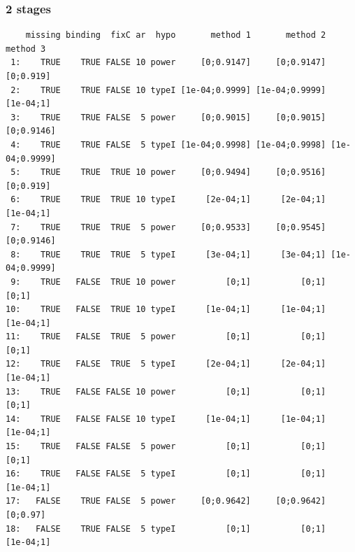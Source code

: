 \documentclass[12pt]{article}
\begin{document}
\subsubsection{2 stages}
\label{sec:orgd6a613a}
\begin{verbatim}
    missing binding  fixC ar  hypo       method 1       method 2       method 3
 1:    TRUE    TRUE FALSE 10 power     [0;0.9147]     [0;0.9147]      [0;0.919]
 2:    TRUE    TRUE FALSE 10 typeI [1e-04;0.9999] [1e-04;0.9999]      [1e-04;1]
 3:    TRUE    TRUE FALSE  5 power     [0;0.9015]     [0;0.9015]     [0;0.9146]
 4:    TRUE    TRUE FALSE  5 typeI [1e-04;0.9998] [1e-04;0.9998] [1e-04;0.9999]
 5:    TRUE    TRUE  TRUE 10 power     [0;0.9494]     [0;0.9516]      [0;0.919]
 6:    TRUE    TRUE  TRUE 10 typeI      [2e-04;1]      [2e-04;1]      [1e-04;1]
 7:    TRUE    TRUE  TRUE  5 power     [0;0.9533]     [0;0.9545]     [0;0.9146]
 8:    TRUE    TRUE  TRUE  5 typeI      [3e-04;1]      [3e-04;1] [1e-04;0.9999]
 9:    TRUE   FALSE  TRUE 10 power          [0;1]          [0;1]          [0;1]
10:    TRUE   FALSE  TRUE 10 typeI      [1e-04;1]      [1e-04;1]      [1e-04;1]
11:    TRUE   FALSE  TRUE  5 power          [0;1]          [0;1]          [0;1]
12:    TRUE   FALSE  TRUE  5 typeI      [2e-04;1]      [2e-04;1]      [1e-04;1]
13:    TRUE   FALSE FALSE 10 power          [0;1]          [0;1]          [0;1]
14:    TRUE   FALSE FALSE 10 typeI      [1e-04;1]      [1e-04;1]      [1e-04;1]
15:    TRUE   FALSE FALSE  5 power          [0;1]          [0;1]          [0;1]
16:    TRUE   FALSE FALSE  5 typeI          [0;1]          [0;1]      [1e-04;1]
17:   FALSE    TRUE FALSE  5 power     [0;0.9642]     [0;0.9642]       [0;0.97]
18:   FALSE    TRUE FALSE  5 typeI          [0;1]          [0;1]      [1e-04;1]
\end{verbatim}

\clearpage
\end{document}

